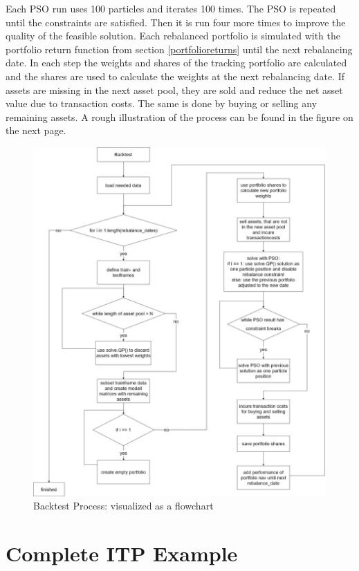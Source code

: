\documentclass[
  oneside, a4paper, 12pt, openany]{book}
\theoremstyle{definition}
\theoremstyle{definition}
\theoremstyle{definition}
\theoremstyle{definition}
\theoremstyle{remark}
\begin{document}
Each PSO run uses 100 particles and iterates 100 times. The PSO is repeated until the constraints are satisfied. Then it is run four more times to improve the quality of the feasible solution. Each rebalanced portfolio is simulated with the portfolio return function from section \ref{portfolioreturns} until the next rebalancing date. In each step the weights and shares of the tracking portfolio are calculated and the shares are used to calculate the weights at the next rebalancing date. If assets are missing in the next asset pool, they are sold and reduce the net asset value due to transaction costs. The same is done by buying or selling any remaining assets. A rough illustration of the process can be found in the figure on the next page.\pagebreak

\begin{figure}
\centering
\includegraphics{img/Chapter9_PSO_Process44.jpg}
\caption{Backtest Process: visualized as a flowchart}
\end{figure}

\pagebreak

\hypertarget{complete-itp-example}{%
\section{Complete ITP Example}\label{complete-itp-example}}
\end{document}
